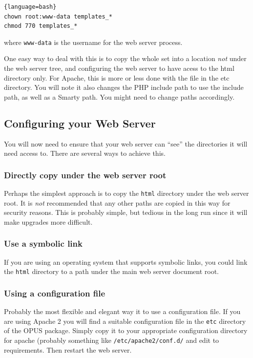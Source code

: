 \documentclass[12 pt]{book}
\begin{document}
\begin{lstlisting}{language=bash}
chown root:www-data templates_*
chmod 770 templates_*
\end{lstlisting}

where \lstinline!www-data! is the username for the web server process.

One easy way to deal with this is to copy the whole set into a location \emph{not} under the web server tree, and configuring the web server to have
acess to the html directory only. For Apache, this is more or less done with the file in the etc directory. You will note it also changes the PHP include
path to use the include path, as well as a Smarty path. You might need to change paths accordingly.

\subsection{Configuring your Web Server}

You will now need to ensure that your web server can ``see'' the directories it will need access to. There are several ways to achieve this.

\subsubsection{Directly copy under the web server root}

Perhaps the simplest approach is to copy the \lstinline!html! directory under the web server root. It is \emph{not} recommended that any other
paths are copied in this way for security reasons. This is probably simple, but tedious in the long run since it will make upgrades more difficult.

\subsubsection{Use a symbolic link}

If you are using an operating system that supports symbolic links, you could link the \lstinline!html! directory to a path under the main web server
document root.

\subsubsection{Using a configuration file}

Probably the most flexible and elegant way it to use a configuration file. If you are using Apache 2 you will find a suitable configuration file in the
\lstinline!etc! directory of the OPUS package. Simply copy it to your appropriate configuration directory for apache (probably something like
\lstinline!/etc/apache2/conf.d/! and edit to requirements. Then restart the web server.
\end{document}
